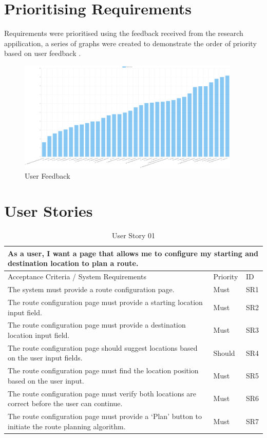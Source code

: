 \section{Prioritising Requirements}
\label{requirements:prioritising}

Requirements were prioritised using the feedback received from the research appilication, a series of graphs were created to demonstrate the order of priority based on user feedback .

\begin{figure}
  \centering
  \includegraphics[width=400px]{figures/logarithmic-scoring.png}
  \caption{User Feedback}
  \label{fig:userfeedback01}
\end{figure}

\clearpage
\section{User Stories}
\label{requirements:user-stories}

\begin{table}[!htb]

\caption{User Story 01}
\label{tab:user-story-01}
\begin{tabular}{ p{8cm} p{1cm}  p{1cm} }
\hline
\multicolumn{3}{p{13cm}}{As a user, I want a page that allows me to configure my starting and destination location to plan a route.}\\ 
\hline
Acceptance Criteria / System Requirements & Priority & ID\\
\hline
The system must provide a route configuration page. & Must & SR1\\
The route configuration page must provide a starting location input field. & Must & SR2\\
The route configuration page must provide a destination location input field. & Must & SR3\\ 
The route configuration page should suggest locations based on the user input fields. & Should & SR4\\ 
The route configuration page must find the location position based on the user input. & Must & SR5\\ 
The route configuration page must verify both locations are correct before the user can continue. & Must & SR6\\ 
The route configuration page must provide a ‘Plan’ button to initiate the route planning algorithm. & Must & SR7\\ 
\hline
\end{tabular}
\end{table}

